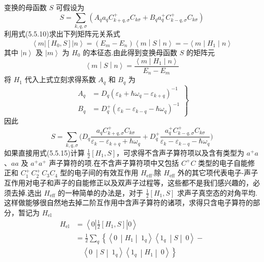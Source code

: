 变换的母函数 $S$ 可假设为
\begin{equation}
  S=\sum_{k,q,\sigma}\left(A_qa_qC_{k+q,\sigma}^{+}C_{k\sigma}
  +B_qa_q^{+}C_{k-q,\sigma}^{+}C_{k\sigma}\right)
\end{equation}
利用式(5.5.10)求出下列矩阵元关系式
\begin{equation*}
  \left\langle m\left|\left[H_0,S\right]\right|n\right\rangle
  =\left(E_m-E_n\right)\left\langle m\middle|S\middle|n\right\rangle
  =-\left\langle m\middle|H_1\middle|n\right\rangle
\end{equation*}
其中 $\left|n\right\rangle$ 及 $\left|m\right\rangle$ 为 $H_0$ 的本征态.由此得到变换母函数 $S$ 的矩阵元
\begin{equation}
  \left\langle m\middle|S\middle|n\right\rangle
  =\frac{\left\langle m\middle|H_1\middle|n\right\rangle}{E_n-E_m}
\end{equation}
将 $H_1$ 代入上式立刻求得系数 $A_q$ 和 $B_q$ 为
\begin{equation}
  \left.\begin{aligned}
  A_q&=D_q\left(\varepsilon_k+\hbar\omega_q-\varepsilon_{k+q}\right)^{-1}\\
  B_q&=D_q^{+}\left(\varepsilon_k-\varepsilon_{k-q}-\hbar\omega_q\right)^{-1}
  \end{aligned}\right\}
\end{equation}
因此
\begin{equation}
  S=\sum_{k,q,\sigma}\biggl(D_q\frac{a_qC_{k+q,\sigma}^{+}C_{k\sigma}}
  {\varepsilon_k-\varepsilon_{k+q}+\hbar\omega_q}
  +D_q^{+}\frac{a_q^{+}C_{k-q,\sigma}^{+}C_{k\sigma}}
  {\varepsilon_k-\varepsilon_{k-q}-\hbar\omega_q}\biggr)
\end{equation}
如果直接用式(5.5.15)计算 $\frac{1}{2}\left[H_1,S\right]$，可求得不含声子算符项以及含有类型为 $a^{+}a$、$aa$ 及 $a^{+}a^{+}$ 声子算符的项.在不含声子算符项中又包括 $C^{+}C$ 类型的电子自能修正和 $C_1^{+}\,C_2^{+}\,C_3C_4$ 型的电子间的有效互作用 $H_{\mathrm{eff}}$.除 $H_{\mathrm{eff}}$ 外的其它项代表电子-声子互作用对电子和声子的自能修正以及双声子过程等，这些都不是我们感兴趣的，必须去掉.选出 $H_{\mathrm{eff}}$ 的一种简单的办法是，对于 $\frac{1}{2}\left[H_1,S\right]$ 求声子真空态的对角平均.这样做能够很自然地去掉二阶互作用中含声子算符的诸项，求得只含电子算符的部分，暂记为 $H_{\mathrm{el}}$
\begin{equation}
\begin{aligned}
  H_{\mathrm{el}}&=\left\langle 0\left|\frac{1}{2}\left[H_1,S\right]\right|0\right\rangle\\
  &=\frac{1}{2}\sum_{q}\left\{\left\langle 0\ \middle|H_1\middle|\ 1_q\right\rangle
  \left\langle 1_q\ \middle|S\middle|\ 0\right\rangle-\right.\\
  &\quad\left.\left\langle 0\ \middle|S\middle|\ 1_q\right\rangle
  \left\langle 1_q\ \middle|H_1\middle|\ 0\right\rangle\right\}
\end{aligned}
\end{equation}
